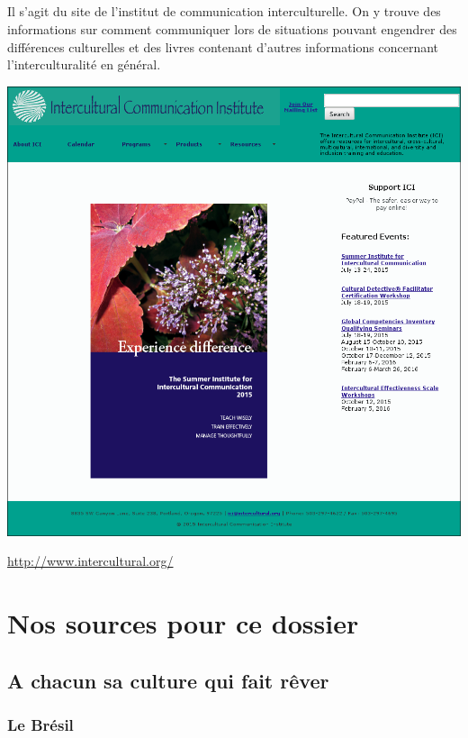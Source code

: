 \paragraph{} Il s'agit du site de l'institut de communication interculturelle.
On y trouve des informations sur comment communiquer lors de situations
pouvant engendrer des différences culturelles et des livres contenant d'autres
informations concernant l'interculturalité en général.

\begin{center}
	\includegraphics[scale=0.25]{Intercultural.png}
\end{center}
\url{http://www.intercultural.org/}

\chapter{Nos sources pour ce dossier}

\section{A chacun sa culture qui fait rêver}

\subsection{Le Brésil}

